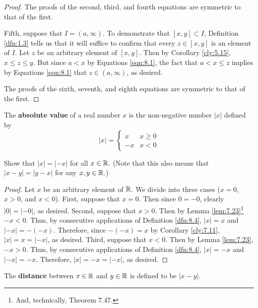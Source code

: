 \documentclass[../main.tex]{subfiles}
\begin{document}
\begin{lemma}
\begin{proof}
        The proofs of the second, third, and fourth equations are symmetric to that of the first.\par
        Fifth, suppose that $I=(a,\infty)$. To demonstrate that $[x,y]\subset I$, Definition \ref{dfn:1.3} tells us that it will suffice to confirm that every $z\in[x,y]$ is an element of $I$. Let $z$ be an arbitrary element of $[x,y]$. Then by Corollary \ref{cly:5.15}, $x\leq z\leq y$. But since $a<x$ by Equations \ref{eqn:8.1}, the fact that $a<x\leq z$ implies by Equations \ref{eqn:8.1} that $z\in(a,\infty)$, as desired.\par
        The proofs of the sixth, seventh, and eighth equations are symmetric to that of the first.
    \end{proof}
\end{lemma}

\begin{definition}\label{dfn:8.4}
    The \textbf{absolute value} of a real number $x$ is the non-negative number $|x|$ defined by
    \begin{equation*}
        |x| =
        \begin{cases}
            x & x\geq 0\\
            -x & x<0
        \end{cases}
    \end{equation*}
\end{definition}

\begin{exercise}\label{exr:8.5}
    Show that $|x|=|-x|$ for all $x\in\mathbb{R}$. (Note that this also means that $|x-y|=|y-x|$ for any $x,y\in\mathbb{R}$.)
    \begin{proof}
        Let $x$ be an arbitrary element of $\mathbb{R}$. We divide into three cases ($x=0$, $x>0$, and $x<0$). First, suppose that $x=0$. Then since $0=-0$, clearly $|0|=|-0|$, as desired. Second, suppose that $x>0$. Then by Lemma \ref{lem:7.23}\footnote{And, technically, Theorem 7.47.} $-x<0$. Thus, by consecutive applications of Definition \ref{dfn:8.4}, $|x|=x$ and $|-x|=-(-x)$. Therefore, since $-(-x)=x$ by Corollary \ref{cly:7.11}, $|x|=x=|-x|$, as desired. Third, suppose that $x<0$. Then by Lemma \ref{lem:7.23}, $-x>0$. Thus, by consecutive applications of Definition \ref{dfn:8.4}, $|x|=-x$ and $|-x|=-x$. Therefore, $|x|=-x=|-x|$, as desired.
    \end{proof}
\end{exercise}

\begin{definition}\label{dfn:8.6}
    The \textbf{distance} between $x\in\mathbb{R}$ and $y\in\mathbb{R}$ is defined to be $|x-y|$.
\end{definition}
\end{document}
